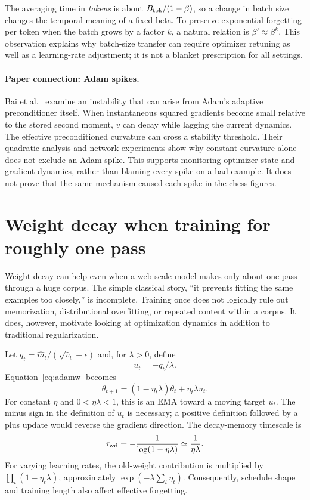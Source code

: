 The averaging time in \emph{tokens} is about $B_{\rm tok}/(1-\beta)$, so a change in batch size changes the temporal meaning of a fixed beta. To preserve exponential forgetting per token when the batch grows by a factor $k$, a natural relation is $\beta'\approx\beta^k$. This observation explains why batch-size transfer can require optimizer retuning as well as a learning-rate adjustment; it is not a blanket prescription for all settings.

\paragraph{Paper connection: Adam spikes.}
Bai et al.~\cite{adamspikes} examine an instability that can arise from Adam's adaptive preconditioner itself. When instantaneous squared gradients become small relative to the stored second moment, $v$ can decay while lagging the current dynamics. The effective preconditioned curvature can cross a stability threshold. Their quadratic analysis and network experiments show why constant curvature alone does not exclude an Adam spike. This supports monitoring optimizer state and gradient dynamics, rather than blaming every spike on a bad example. It does not prove that the same mechanism caused each spike in the chess figures.

\section{Weight decay when training for roughly one pass}
Weight decay can help even when a web-scale model makes only about one pass through a huge corpus. The simple classical story, ``it prevents fitting the same examples too closely,'' is incomplete. Training once does not logically rule out memorization, distributional overfitting, or repeated content within a corpus. It does, however, motivate looking at optimization dynamics in addition to traditional regularization.

Let $q_t=\widehat m_t/(\sqrt{\widehat v_t}+\epsilon)$ and, for $\lambda>0$, define
\begin{equation}
 u_t=-q_t/\lambda.
\end{equation}
Equation~\eqref{eq:adamw} becomes
\begin{equation}
 \theta_{t+1}=(1-\eta_t\lambda)\theta_t+\eta_t\lambda u_t.
\end{equation}
For constant $\eta$ and $0<\eta\lambda<1$, this is an EMA toward a moving target $u_t$. The minus sign in the definition of $u_t$ is necessary; a positive definition followed by a plus update would reverse the gradient direction. The decay-memory timescale is
\begin{equation}\label{eq:wdtime}
 \tau_{\rm wd}=-\frac{1}{\log(1-\eta\lambda)}\simeq\frac{1}{\eta\lambda}.
\end{equation}
For varying learning rates, the old-weight contribution is multiplied by $\prod_t(1-\eta_t\lambda)$, approximately $\exp(-\lambda\sum_t\eta_t)$. Consequently, schedule shape and training length also affect effective forgetting.

